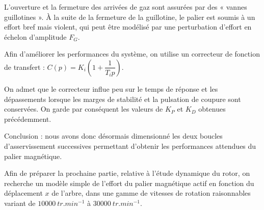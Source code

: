 \ifprof
\else 
L'ouverture et la fermeture des arrivées de gaz sont assurées par des « vannes
guillotines ». À la suite de la fermeture de la guillotine, le palier est soumis à un
effort bref mais violent, qui peut être modélisé par une perturbation d'effort en
échelon d'amplitude $F_G$.
\fi

\ifprof
\else 
\fi

\ifprof
\else 
Afin d'améliorer les performances du système, on utilise un correcteur de fonction
de transfert : $C(p)=K_i \left( 1+\dfrac{1}{T_i p}\right)$.
\fi

\ifprof
\else 
\fi

\ifprof
\else 
\fi

\ifprof
\else 

On admet que le correcteur influe peu sur le temps de réponse et les dépassements
lorsque les marges de stabilité et la pulsation de coupure sont conservées.
On garde par conséquent les valeurs de $K_P$ et $K_D$ obtenues précédemment.

Conclusion : nous avons donc désormais dimensionné les deux boucles d'asservissement
successives permettant d'obtenir les performances attendues du palier
magnétique.

Afin de préparer la prochaine partie, relative à l'étude dynamique du rotor, on
recherche un modèle simple de l'effort du palier magnétique actif en fonction du
déplacement $x$ de l'arbre, dans une gamme de vitesses de rotation raisonnables
variant de $\SI{10000}{tr.min^{-1}}$ à $\SI{30000}{tr.min^{-1}}$.
\fi


\ifprof
\else 
\fi



